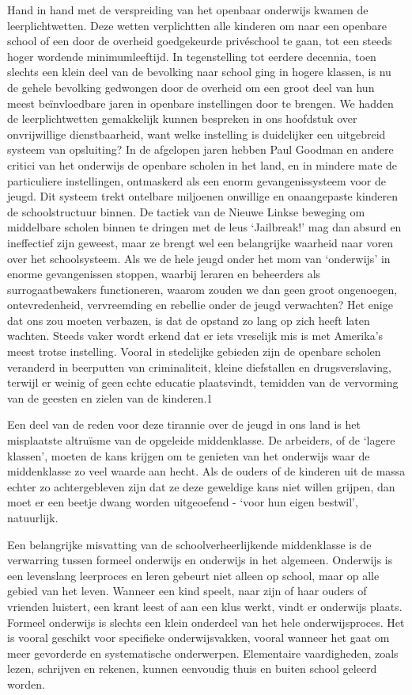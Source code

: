 \documentclass[
  a5paper,
  smalldemyvopaper,10pt,twoside,onecolumn,openright,extrafontsizes,hidelinks]{memoir}
\begin{document}
Hand in hand met de verspreiding van het openbaar onderwijs kwamen de
leerplichtwetten. Deze wetten verplichtten alle kinderen om naar een
openbare school of een door de overheid goedgekeurde privéschool te
gaan, tot een steeds hoger wordende minimumleeftijd. In tegenstelling
tot eerdere decennia, toen slechts een klein deel van de bevolking naar
school ging in hogere klassen, is nu de gehele bevolking gedwongen door
de overheid om een groot deel van hun meest beïnvloedbare jaren in
openbare instellingen door te brengen. We hadden de leerplichtwetten
gemakkelijk kunnen bespreken in ons hoofdstuk over onvrijwillige
dienstbaarheid, want welke instelling is duidelijker een uitgebreid
systeem van opsluiting? In de afgelopen jaren hebben Paul Goodman en
andere critici van het onderwijs de openbare scholen in het land, en in
mindere mate de particuliere instellingen, ontmaskerd als een enorm
gevangenissysteem voor de jeugd. Dit systeem trekt ontelbare miljoenen
onwillige en onaangepaste kinderen de schoolstructuur binnen. De tactiek
van de Nieuwe Linkse beweging om middelbare scholen binnen te dringen
met de leus `Jailbreak!' mag dan absurd en ineffectief zijn geweest,
maar ze brengt wel een belangrijke waarheid naar voren over het
schoolsysteem. Als we de hele jeugd onder het mom van `onderwijs' in
enorme gevangenissen stoppen, waarbij leraren en beheerders als
surrogaatbewakers functioneren, waarom zouden we dan geen groot
ongenoegen, ontevredenheid, vervreemding en rebellie onder de jeugd
verwachten? Het enige dat ons zou moeten verbazen, is dat de opstand zo
lang op zich heeft laten wachten. Steeds vaker wordt erkend dat er iets
vreselijk mis is met Amerika's meest trotse instelling. Vooral in
stedelijke gebieden zijn de openbare scholen veranderd in beerputten van
criminaliteit, kleine diefstallen en drugsverslaving, terwijl er weinig
of geen echte educatie plaatsvindt, temidden van de vervorming van de
geesten en zielen van de kinderen.1

Een deel van de reden voor deze tirannie over de jeugd in ons land is
het misplaatste altruïsme van de opgeleide middenklasse. De arbeiders,
of de `lagere klassen', moeten de kans krijgen om te genieten van het
onderwijs waar de middenklasse zo veel waarde aan hecht. Als de ouders
of de kinderen uit de massa echter zo achtergebleven zijn dat ze deze
geweldige kans niet willen grijpen, dan moet er een beetje dwang worden
uitgeoefend - `voor hun eigen bestwil', natuurlijk.

Een belangrijke misvatting van de schoolverheerlijkende middenklasse is
de verwarring tussen formeel onderwijs en onderwijs in het algemeen.
Onderwijs is een levenslang leerproces en leren gebeurt niet alleen op
school, maar op alle gebied van het leven. Wanneer een kind speelt, naar
zijn of haar ouders of vrienden luistert, een krant leest of aan een
klus werkt, vindt er onderwijs plaats. Formeel onderwijs is slechts een
klein onderdeel van het hele onderwijsproces. Het is vooral geschikt
voor specifieke onderwijsvakken, vooral wanneer het gaat om meer
gevorderde en systematische onderwerpen. Elementaire vaardigheden, zoals
lezen, schrijven en rekenen, kunnen eenvoudig thuis en buiten school
geleerd worden.
\end{document}
